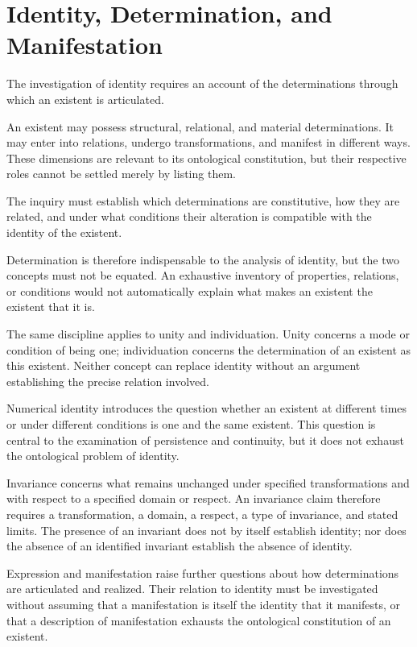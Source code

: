
\section*{Identity, Determination, and Manifestation}

The investigation of identity requires an
account of the determinations through which
an existent is articulated.

An existent may possess structural, relational,
and material determinations. It may enter
into relations, undergo transformations,
and manifest in different ways. These dimensions
are relevant to its ontological constitution,
but their respective roles cannot be settled
merely by listing them.

The inquiry must establish which determinations
are constitutive, how they are related, and
under what conditions their alteration is
compatible with the identity of the existent.

Determination is therefore indispensable
to the analysis of identity, but the two
concepts must not be equated. An exhaustive
inventory of properties, relations, or
conditions would not automatically explain
what makes an existent the existent that
it is.

The same discipline applies to unity and
individuation. Unity concerns a mode or
condition of being one; individuation concerns
the determination of an existent as this
existent. Neither concept can replace identity
without an argument establishing the precise
relation involved.

Numerical identity introduces the question
whether an existent at different times or
under different conditions is one and the
same existent. This question is central to
the examination of persistence and continuity,
but it does not exhaust the ontological
problem of identity.

Invariance concerns what remains unchanged
under specified transformations and with
respect to a specified domain or respect.
An invariance claim therefore requires
a transformation, a domain, a respect,
a type of invariance, and stated limits.
The presence of an invariant does not
by itself establish identity; nor does
the absence of an identified invariant
establish the absence of identity.

Expression and manifestation raise further
questions about how determinations are
articulated and realized. Their relation
to identity must be investigated without
assuming that a manifestation is itself
the identity that it manifests, or that
a description of manifestation exhausts
the ontological constitution of an existent.


